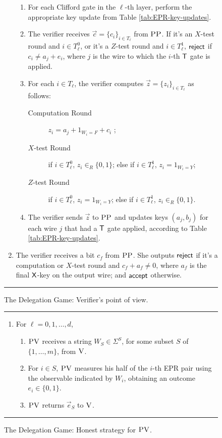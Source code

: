 \documentclass[11pt,letter]{article}
\theoremstyle{remark}
\theoremstyle{definition}
\newcommand{\ver}{\textsc{V}}
\newcommand{\pv}{\textsc{PV}}
\newcommand{\pp}{\textsc{PP}}
\begin{document}
\begin{figure}[H]
\begin{enumerate}
\begin{enumerate}
  \item For each Clifford gate in the $\ell$-th layer, perform the appropriate key update from Table \ref{tab:EPR-key-updates}.
 \item The verifier receives $\vec{c} = \{c_i\}_{i\in T_{\ell}}$ from $\pp$. If it's an $X$-test round and $i\in T_\ell^0$, or it's a $Z$-test round and $i\in T_\ell^1$, $\sf reject$ if $c_i\neq a_{j}+ e_i$, where $j$ is the wire to which the $i$-th $\sf T$ gate is applied.
\item For each $i\in T_\ell$, the verifier computes $\vec{z}=\{z_i\}_{i\in T_\ell}$ as follows: 
\begin{description}
\item[Computation Round] $z_i=a_{j}+ 1_{W_i=F} + c_i$ ;
\item[$X$-test Round] if $i\in T_\ell^0$, $z_i\in_R\{0,1\}$; else if $i\in T_\ell^1$, $z_i=1_{W_i=Y}$;
\item[$Z$-test Round] if $i\in T_\ell^0$, $z_i=1_{W_i=Y}$; else if $i\in T_\ell^1$, $z_i\in_R\{0,1\}$.
\end{description}
\item The verifier sends $\vec{z}$ to $\pp$ and updates keys $(a_j,b_j)$ for each wire $j$ that had a $\sf T$ gate applied, according to Table \ref{tab:EPR-key-updates}.
\end{enumerate} 
\item The verifier receives a bit $c_f$ from $\pp$. She outputs $\sf reject$ if it's a computation or $X$-test round and $c_f+ a_f\neq 0$, where $a_f$ is the final $\sf X$-key on the output wire; and $\sf accept$ otherwise.
\end{enumerate}
\rule[2ex]{16.5cm}{0.5pt}\vspace{-.5cm}
\caption{The Delegation Game: Verifier's point of view.}\label{fig:leash-protocol-V}
\end{figure}

\begin{figure}[H]
\rule[1ex]{16.5cm}{0.5pt}
\begin{enumerate}
\item For $\ell=0,1,\ldots,d$,
\begin{enumerate}
\item $\pv$ receives a string $W_{S} \in\Sigma^{S}$, for some subset $S$ of $\{1,\ldots,m\}$, from $\ver$. 
\item For $i\in S$, $\pv$ measures his half of the $i$-th EPR pair using the observable indicated by $W_i$, obtaining an outcome $e_i\in\{0,1\}$. 
\item $\pv$ returns $\vec{e}_S$ to $\ver$. 
\end{enumerate}
\end{enumerate}
\rule[2ex]{16.5cm}{0.5pt}\vspace{-.5cm}
\caption{The Delegation Game: Honest strategy for $\pv$.}\label{fig:leash-protocol-PV}
\end{figure}
\end{document}
